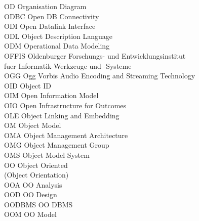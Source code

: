 \begin{tabbing}
    \>OD \>\>Organisation Diagram\\

    \>ODBC \>\>Open DB Connectivity\\

    \>ODI \>\>Open Datalink Interface\\

    \>ODL \>\>Object Description Language\\

    \>ODM \>\>Operational Data Modeling\\


    \>OFFIS \>\>Oldenburger Forschungs- und Entwicklungsinstitut\\
        \>\>\>fuer Informatik-Werkzeuge und -Systeme\\

    \>OGG \>\>Ogg Vorbis Audio Encoding and Streaming Technology\\

    \>OID \>\>Object ID\\

    \>OIM \>\>Open Information Model\\

    \>OIO \>\>Open Infrastructure for Outcomes\\

    \>OLE \>\>Object Linking and Embedding\\

    \>OM \>\>Object Model\\

    \>OMA \>\>Object Management Architecture\\

    \>OMG \>\>Object Management Group\\

    \>OMS \>\>Object Model System\\

    \>OO \>\>Object Oriented\\
        \>\>\>(Object Orientation)\\

    \>OOA \>\>OO Analysis\\

    \>OOD \>\>OO Design\\

    \>OODBMS \>\>OO DBMS\\

    \>OOM \>\>OO Model\\


\end{tabbing}

